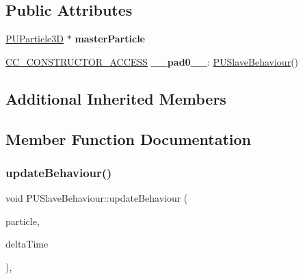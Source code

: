 \subsection*{Public Attributes}
\begin{DoxyCompactItemize}
\item 
\mbox{\label{classPUSlaveBehaviour_af4286c43e0b316fb6914838c02762fa8}} 
\hyperlink{structPUParticle3D}{P\+U\+Particle3D} $\ast$ {\bfseries master\+Particle}
\item 
\mbox{\label{classPUSlaveBehaviour_a9995a5c441ec35dff0bf2856ee3e3518}} 
\hyperlink{_2cocos2d_2cocos_2base_2ccConfig_8h_a25ef1314f97c35a2ed3d029b0ead6da0}{C\+C\+\_\+\+C\+O\+N\+S\+T\+R\+U\+C\+T\+O\+R\+\_\+\+A\+C\+C\+E\+SS} {\bfseries \+\_\+\+\_\+pad0\+\_\+\+\_\+}\+: \hyperlink{classPUSlaveBehaviour}{P\+U\+Slave\+Behaviour}()
\end{DoxyCompactItemize}
\subsection*{Additional Inherited Members}


\subsection{Member Function Documentation}
\mbox{\label{classPUSlaveBehaviour_a78a522da7be0a4780b790313f3cb193f}} 
\subsubsection{\texorpdfstring{update\+Behaviour()}{updateBehaviour()}\hspace{0.1cm}{\footnotesize\ttfamily [1/2]}}
{\footnotesize\ttfamily void P\+U\+Slave\+Behaviour\+::update\+Behaviour (\begin{DoxyParamCaption}\item[{\hyperlink{structPUParticle3D}{P\+U\+Particle3D} $\ast$}]{particle,  }\item[{float}]{delta\+Time }\end{DoxyParamCaption})\hspace{0.3cm}{\ttfamily [override]}, {\ttfamily [virtual]}}


